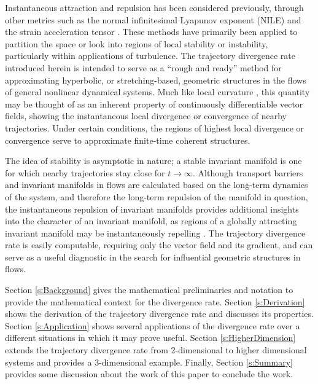 \documentclass[twocolumn]{svjour3}
\begin{document}

Instantaneous attraction and repulsion has been considered previously, through other metrics such as the normal infinitesimal Lyapunov exponent (NILE) \cite{haller2010localized} and the strain acceleration tensor \cite{haller2001lagrangian}. These methods have primarily been applied to partition the space or look into regions of local stability or instability, particularly within applications of turbulence. The trajectory divergence rate introduced herein is intended to serve as a ``rough and ready'' method for approximating hyperbolic, or stretching-based, geometric structures in the flows of general nonlinear dynamical systems. Much like local curvature \cite{desroches2011canards}, this quantity may be thought of as an inherent property of continuously differentiable vector fields, showing the instantaneous local divergence or convergence of nearby trajectories. Under certain conditions, the regions of highest local divergence or convergence serve to approximate finite-time coherent structures.

The idea of stability is asymptotic in nature; a stable invariant manifold is one for which nearby trajectories stay close for $t\to\infty$. Although transport barriers and invariant manifolds in flows are calculated based on the long-term dynamics of the system, and therefore the long-term repulsion of the manifold in question, the instantaneous repulsion of invariant manifolds provides additional insights into the character of an invariant manifold, as regions of a globally attracting invariant manifold may be instantaneously repelling \cite{haller2001lagrangian,tallapragada2017globally}. The trajectory divergence rate is easily computable, requiring only the vector field and its gradient, and can serve as a useful diagnostic in the search for influential geometric structures in flows.

Section \ref{s:Background} gives the mathematical preliminaries and notation to provide the mathematical context for the divergence rate. Section \ref{s:Derivation} shows the derivation of the trajectory divergence rate and discusses its properties. Section \ref{s:Application} shows several applications of the divergence rate over a different situations in which it may prove useful. Section \ref{s:HigherDimension} extends the trajectory divergence rate from 2-dimensional to higher dimensional systems and provides a 3-dimensional example. Finally, Section \ref{s:Summary} provides some discussion about the work of this paper to conclude the work.
\end{document}
